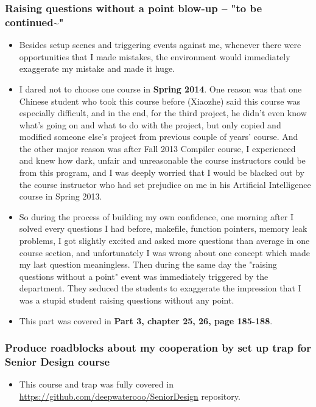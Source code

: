 \documentclass[9pt,b5paper]{article}
\begin{document}
\subsubsection{Raising questions without a point blow-up -- "to be continued\textasciitilde{}"}
\label{sec-12-3-6}
\begin{itemize}
\item Besides setup scenes and triggering events against me, whenever there were opportunities that I made mistakes, the environment would immediately exaggerate my mistake and made it huge.
\item I dared not to choose one course in \textbf{Spring 2014}. One reason was that one Chinese student who took this course before (Xiaozhe) said this course was especially difficult, and in the end, for the third project, he didn't even know what's going on and what to do with the project, but only copied and modified someone else's project from previous couple of years' course. And the other major reason was after Fall 2013 Compiler course, I experienced and knew how dark, unfair and unreasonable the course instructors could be from this program, and I was deeply worried that I would be blacked out by the course instructor who had set prejudice on me in his Artificial Intelligence course in Spring 2013.
\item So during the process of building my own confidence, one morning after I solved every questions I had before, makefile, function pointers, memory leak problems, I got slightly excited and asked more questions than average in one course section, and unfortunately I was wrong about one concept which made my last question meaningless. Then during the same day the "raising questions without a point" event was immediately triggered by the department. They seduced the students to exaggerate the impression that I was a stupid student raising questions without any point.
\item This part was covered in \textbf{Part 3, chapter 25, 26, page 185-188}.
\end{itemize}

\subsubsection{Produce roadblocks about my cooperation by set up trap for Senior Design course}
\label{sec-12-3-7}
\begin{itemize}
\item This course and trap was fully covered in \url{https://github.com/deepwaterooo/SeniorDesign} repository.
\end{itemize}
\end{document}
